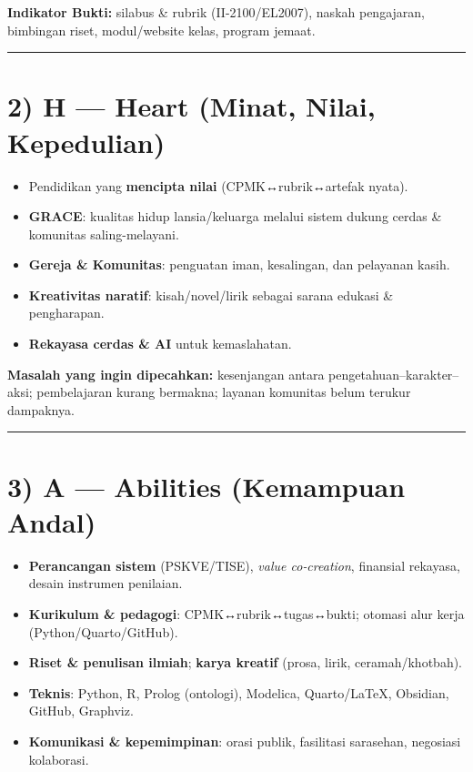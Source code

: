 \documentclass[
  letterpaper,
  DIV=11,
  numbers=noendperiod]{scrreprt}
\providecommand{\tightlist}{%
  \setlength{\itemsep}{0pt}\setlength{\parskip}{0pt}}\usepackage{longtable,booktabs,array}
\begin{document}
\textbf{Indikator Bukti:} silabus \& rubrik (II-2100/EL2007), naskah
pengajaran, bimbingan riset, modul/website kelas, program jemaat.

\begin{center}\rule{0.5\linewidth}{0.5pt}\end{center}

\section{2) H --- Heart (Minat, Nilai,
Kepedulian)}\label{h-heart-minat-nilai-kepedulian}

\begin{itemize}
\tightlist
\item
  Pendidikan yang \textbf{mencipta nilai} (CPMK↔rubrik↔artefak nyata).
\item
  \textbf{GRACE}: kualitas hidup lansia/keluarga melalui sistem dukung
  cerdas \& komunitas saling-melayani.
\item
  \textbf{Gereja \& Komunitas}: penguatan iman, kesalingan, dan
  pelayanan kasih.
\item
  \textbf{Kreativitas naratif}: kisah/novel/lirik sebagai sarana edukasi
  \& pengharapan.
\item
  \textbf{Rekayasa cerdas \& AI} untuk kemaslahatan.
\end{itemize}

\textbf{Masalah yang ingin dipecahkan:} kesenjangan antara
pengetahuan--karakter--aksi; pembelajaran kurang bermakna; layanan
komunitas belum terukur dampaknya.

\begin{center}\rule{0.5\linewidth}{0.5pt}\end{center}

\section{3) A --- Abilities (Kemampuan
Andal)}\label{a-abilities-kemampuan-andal}

\begin{itemize}
\tightlist
\item
  \textbf{Perancangan sistem} (PSKVE/TISE), \emph{value co‑creation},
  finansial rekayasa, desain instrumen penilaian.
\item
  \textbf{Kurikulum \& pedagogi}: CPMK↔rubrik↔tugas↔bukti; otomasi alur
  kerja (Python/Quarto/GitHub).
\item
  \textbf{Riset \& penulisan ilmiah}; \textbf{karya kreatif} (prosa,
  lirik, ceramah/khotbah).
\item
  \textbf{Teknis}: Python, R, Prolog (ontologi), Modelica, Quarto/LaTeX,
  Obsidian, GitHub, Graphviz.
\item
  \textbf{Komunikasi \& kepemimpinan}: orasi publik, fasilitasi
  sarasehan, negosiasi kolaborasi.
\end{itemize}
\end{document}
